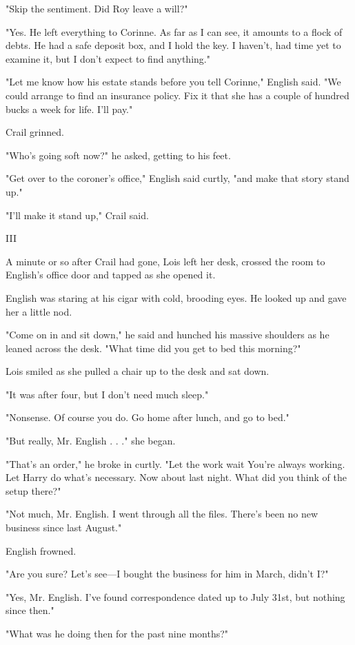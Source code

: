 \documentclass{novel}
\begin{document}
"Skip the sentiment. Did Roy leave a will?"

"Yes. He left everything to Corinne. As far as I can see, it amounts to a flock of debts. He had a safe deposit box, and I hold the key. I haven't, had time yet to examine it, but I don't expect to find anything."

"Let me know how his estate stands before you tell Corinne," English said. "We could arrange to find an insurance policy. Fix it that she has a couple of hundred bucks a week for life. I'll pay."

Crail grinned.

"Who's going soft now?" he asked, getting to his feet.

"Get over to the coroner's office," English said curtly, "and make that story stand up."

"I'll make it stand up," Crail said.



III

A minute or so after Crail had gone, Lois left her desk, crossed the room to English's office door and tapped as she opened it.

English was staring at his cigar with cold, brooding eyes. He looked up and gave her a little nod.

"Come on in and sit down," he said and hunched his massive shoulders as he leaned across the desk. "What time did you get to bed this morning?"

Lois smiled as she pulled a chair up to the desk and sat down.

"It was after four, but I don't need much sleep."

"Nonsense. Of course you do. Go home after lunch, and go to bed."

"But really, Mr. English . . ." she began.

"That's an order," he broke in curtly. "Let the work wait You're always working. Let Harry do what's necessary. Now about last night. What did you think of the setup there?"

"Not much, Mr. English. I went through all the files. There's been no new business since last August."

English frowned.

"Are you sure? Let's see—I bought the business for him in March, didn't I?"

"Yes, Mr. English. I've found correspondence dated up to July 31st, but nothing since then."

"What was he doing then for the past nine months?"
\end{document}
